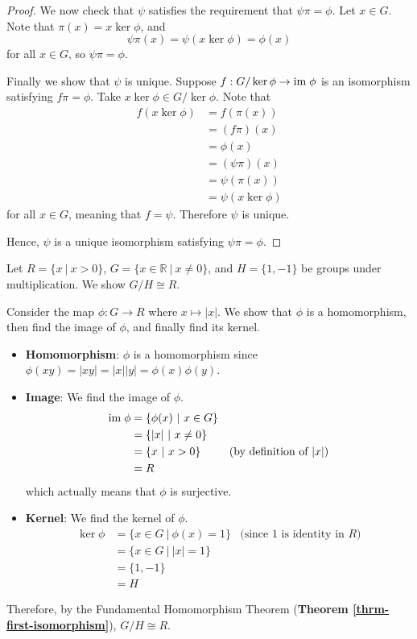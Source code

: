 \begin{proof}
    We now check that $\psi$ satisfies the requirement that $\psi\pi = \phi$. Let $x \in G$. Note that $\pi(x) = x\ker\phi$, and
    \[
        \psi\pi(x) = \psi(x\ker\phi) = \phi(x)
    \]
    for all $x \in G$, so $\psi\pi = \phi$.

    Finally we show that $\psi$ is unique. Suppose $f: G/\ker\phi \to \mathrm{im}\;\phi$ is an isomorphism satisfying $f\pi=\phi$. Take $x\ker\phi \in G/\ker\phi$. Note that
    \begin{align*}
        f(x\ker\phi) &= f(\pi(x))\\
        &= (f\pi)(x)\\
        &= \phi(x)\\
        &= (\psi\pi)(x)\\
        &= \psi(\pi(x))\\
        &= \psi(x\ker\phi)
    \end{align*}
    for all $x \in G$, meaning that $f = \psi$. Therefore $\psi$ is unique.

    Hence, $\psi$ is a unique isomorphism satisfying $\psi\pi = \phi$.
\end{proof}

\begin{example}
    Let $R = \{x \ | \ x > 0\}$, $G = \{x \in \mathbb{R} \ | \ x \neq 0\}$, and $H = \{1, -1\}$ be groups under multiplication. We show $G / H \cong R$.

    Consider the map $\phi: G \to R$ where $x \mapsto |x|$. We show that $\phi$ is a homomorphism, then find the image of $\phi$, and finally find its kernel.
    \begin{itemize}
        \item \textbf{Homomorphism}: $\phi$ is a homomorphism since $\phi(xy) = |xy| = |x||y| = \phi(x)\phi(y)$.
        \item \textbf{Image}: We find the image of $\phi$.
        \begin{align*}
            \mathrm{im}\;\phi &= \{\phi(x) \ | \ x \in G\}\\
            &= \{|x| \ | \ x \neq 0\}\\
            &= \{x \ | \ x > 0\} & \text{(by definition of } |x|)\\
            &= R
        \end{align*}
        which actually means that $\phi$ is surjective.
        \item \textbf{Kernel}: We find the kernel of $\phi$.
        \begin{align*}
            \ker\phi &= \{x \in G \ | \ \phi(x) = 1\} & \text{(since } 1 \text{ is identity in } R)\\
            &= \{x \in G \ | \ |x| = 1\}\\
            &= \{1, -1\}\\
            &= H
        \end{align*}
    \end{itemize}
    Therefore, by the Fundamental Homomorphism Theorem (\textbf{Theorem \ref{thrm-first-isomorphism}}), $G/H \cong R$.
\end{example}

